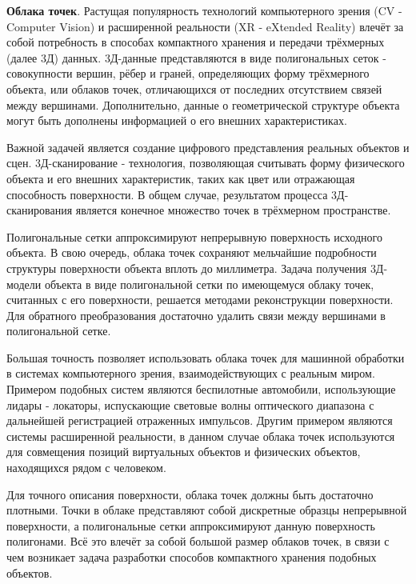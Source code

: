 \textbf{Облака точек}. Растущая популярность технологий компьютерного
зрения (CV - Computer Vision) и расширенной реальности (XR - eXtended Reality)
влечёт за собой потребность в способах компактного хранения и передачи
трёхмерных (далее 3Д) данных. 3Д-данные представляются в виде полигональных
сеток - совокупности вершин, рёбер и граней, определяющих форму трёхмерного
объекта, или облаков точек, отличающихся от последних отсутствием связей между
вершинами. Дополнительно, данные о геометрической структуре объекта могут быть
дополнены информацией о его внешних характеристиках.

Важной задачей является создание цифрового представления реальных объектов и
сцен. 3Д-сканирование - технология, позволяющая считывать форму физического
объекта и его внешних характеристик, таких как цвет или отражающая способность
поверхности. В общем случае, результатом процесса 3Д-сканирования является
конечное множество точек в трёхмерном
пространстве\cite[10]{SurfaceReconstruction}.

Полигональные сетки аппроксимируют непрерывную поверхность исходного объекта. В
свою очередь, облака точек сохраняют мельчайшие подробности структуры
поверхности объекта вплоть до миллиметра\cite[33]{SurfaceReconstruction}. Задача
получения 3Д-модели объекта в виде полигональной сетки по имеющемуся облаку
точек, считанных с его поверхности, решается методами реконструкции
поверхности\cite{SurfaceReconstruction}. Для обратного преобразования достаточно
удалить связи между вершинами в полигональной сетке.

Большая точность позволяет использовать облака точек для машинной обработки в
системах компьютерного зрения, взаимодействующих с реальным миром. Примером
подобных систем являются беспилотные автомобили, использующие лидары - локаторы,
испускающие световые волны оптического диапазона с дальнейшей регистрацией
отраженных импульсов\cite[7]{PointCloudAnalysis}. Другим примером являются
системы расширенной реальности, в данном случае облака точек используются для
совмещения позиций виртуальных объектов и физических объектов, находящихся рядом
с человеком\cite[15]{PointCloudAnalysis}.

Для точного описания поверхности, облака точек должны быть достаточно плотными.
Точки в облаке представляют собой дискретные образцы непрерывной поверхности, а
полигональные сетки аппроксимируют данную поверхность
полигонами\cite[4]{PointCloudAnalysis}. Всё это влечёт за собой большой размер
облаков точек, в связи с чем возникает задача
разработки способов компактного хранения подобных объектов.

